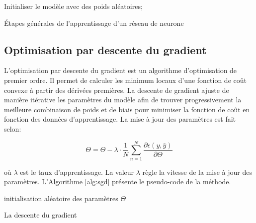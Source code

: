 \begin{algorithm}[]
\small
\SetAlgoLined
 Initialiser le modèle avec des poids aléatoires;
 
 \caption{Étapes générales de l'apprentissage d'un réseau de neurone}
 \label{alg:basic_machine_learning_steps}
\end{algorithm}

\subsection{Optimisation par descente du gradient}

L'optimisation par descente du gradient est un algorithme d'optimisation de premier ordre.  Il permet de calculer les minimum locaux d'une fonction de coût convexe à partir des dérivées premières. La descente de gradient ajuste de manière itérative les paramètres du modèle afin de trouver progressivement la meilleure combinaison de poids et de biais pour minimiser la fonction de coût en fonction des données d'apprentissage.  La mise à jour des paramètres est fait selon:

\begin{equation}
      \Theta = \Theta - \lambda \cdot \frac{1}{N} \sum_{n=1}^{N} \frac{\partial \epsilon(y, \bar{y})}{\partial \Theta}
      \label{eq:gradient_descent}
\end{equation}

où $\lambda$ est le taux d'apprentissage.  La valeur $\lambda$ règle la vitesse de la mise à jour des paramètres. L'Algorithme \ref{alg:sgd} présente le pseudo-code de la méthode.
\newline

\begin{algorithm}[]
\small
\SetAlgoLined
{}

initialisation aléatoire des paramètres $\Theta$\; 
 \caption{La descente du gradient}
  \label{alg:sgd}
\end{algorithm}

